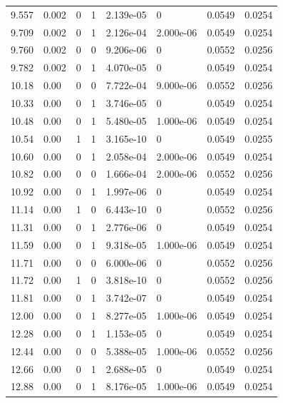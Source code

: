 \documentclass[preview]{standalone}
\begin{document}
{{{\begin{tabular}{L{1.2cm}C{1.2cm} C{0.3cm}C{0.5cm} C{1.4cm}C{1.4cm} C{1.4cm}C{1.4cm}}
  9.557  &  0.002  & 0     &  1 &  2.139e-05  & 0  & 0.0549 &  0.0254   \\ 
  9.709  &  0.002  & 0     &  1 &  2.126e-04  & 2.000e-06  & 0.0549 &  0.0254   \\ 
  9.760  &  0.002  & 0     &  0 &  9.206e-06  & 0  & 0.0552 &  0.0256   \\ 
  9.782  &  0.002  & 0     &  1 &  4.070e-05  & 0  & 0.0549 &  0.0254   \\ 
  10.18  &  0.00  & 0     &  0 &  7.722e-04  & 9.000e-06  & 0.0552 &  0.0256   \\ 
  10.33  &  0.00  & 0     &  1 &  3.746e-05  & 0  & 0.0549 &  0.0254   \\ 
  10.48  &  0.00  & 0     &  1 &  5.480e-05  & 1.000e-06  & 0.0549 &  0.0254   \\ 
  10.54  &  0.00  & 1     &  1 &  3.165e-10  & 0  & 0.0549 &  0.0255   \\ 
  10.60  &  0.00  & 0     &  1 &  2.058e-04  & 2.000e-06  & 0.0549 &  0.0254   \\ 
  10.82  &  0.00  & 0     &  0 &  1.666e-04  & 2.000e-06  & 0.0552 &  0.0256   \\ 
  10.92  &  0.00  & 0     &  1 &  1.997e-06  & 0  & 0.0549 &  0.0254   \\ 
  11.14  &  0.00  & 1     &  0 &  6.443e-10  & 0  & 0.0552 &  0.0256   \\ 
  11.31  &  0.00  & 0     &  1 &  2.776e-06  & 0  & 0.0549 &  0.0254   \\ 
  11.59  &  0.00  & 0     &  1 &  9.318e-05  & 1.000e-06  & 0.0549 &  0.0254   \\ 
  11.71  &  0.00  & 0     &  0 &  6.000e-06  & 0  & 0.0552 &  0.0256   \\ 
  11.72  &  0.00  & 1     &  0 &  3.818e-10  & 0  & 0.0552 &  0.0256   \\ 
  11.81  &  0.00  & 0     &  1 &  3.742e-07  & 0  & 0.0549 &  0.0254   \\ 
  12.00  &  0.00  & 0     &  1 &  8.277e-05  & 1.000e-06  & 0.0549 &  0.0254   \\ 
  12.28  &  0.00  & 0     &  1 &  1.153e-05  & 0  & 0.0549 &  0.0254   \\ 
  12.44  &  0.00  & 0     &  0 &  5.388e-05  & 1.000e-06  & 0.0552 &  0.0256   \\ 
  12.66  &  0.00  & 0     &  1 &  2.688e-05  & 0  & 0.0549 &  0.0254   \\ 
  12.88  &  0.00  & 0     &  1 &  8.176e-05  & 1.000e-06  & 0.0549 &  0.0254   \\ 

\end{tabular}}}}
\end{document}
